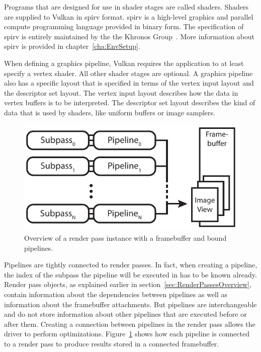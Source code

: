     Programs that are designed for use in shader stages are called shaders.
    Shaders are supplied to Vulkan in \gls{spirv} format.
    \gls{spirv} is a high-level graphics and parallel compute programming language provided in binary form.
    The specification of \gls{spirv} is entirely maintained by the the Khronos Group~\cite{spirvspecprov}.
    More information about \gls{spirv} is provided in chapter~\ref{cha:EnvSetup}.

    When defining a graphics pipeline, Vulkan requires the \gls{application} to at least specify a vertex shader.
    All other shader stages are optional.
    A graphics pipeline also has a specific layout that is specified in terms of the vertex input layout and the descriptor set layout.
    The vertex input layout describes how the data in vertex buffers is to be interpreted.
    The descriptor set layout describes the kind of data that is used by shaders, like uniform buffers or image samplers.


    \begin{figure}
      \label{fig:RenderPassInstanceSample}
      \centering
      \includegraphics[width=\textwidth]{Main/Images/RenderPassInstanceSample}
      \caption{Overview of a render pass instance with a framebuffer and bound pipelines.}
    \end{figure}


    Pipelines are tightly connected to render passes.
    In fact, when creating a pipeline, the index of the subpass the pipeline will be executed in has to be known already.
    Render pass objects, as explained earlier in section~\ref{sec:RenderPassesOverview}, contain information about the dependencies between pipelines as well as information about the framebuffer attachments.
    But pipelines are interchangeable and do not store information about other pipelines that are executed before or after them.
    Creating a connection between pipelines in the render pass allows the \gls{driver} to perform optimizations.
    Figure~\ref{fig:RenderPassInstanceSample} shows how each pipeline is connected to a render pass to produce results stored in a connected framebuffer.

